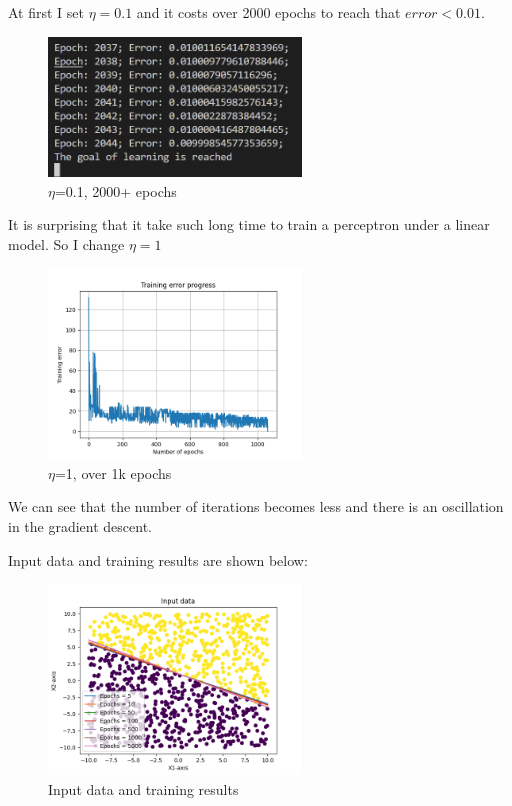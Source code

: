 At first I set $\eta=0.1$ and it costs over 2000 epochs to reach that $error < 0.01$.

\begin{figure}[H]
    \centering
    \includegraphics[width=0.6\textwidth]{./2023April/eta0.1.png}
    \caption{$\eta$=0.1, 2000+ epochs}
    \label{eta0.1}
\end{figure}

It is surprising that it take such long time to train a perceptron under a linear model. So I change $\eta=1$

\begin{figure}[H]
    \centering
    \includegraphics[width=0.6\textwidth]{./2023April/graphEta1.png}
    \caption{$\eta$=1, over 1k epochs}
    \label{eta1}
\end{figure}

We can see that the number of iterations becomes less and there is an oscillation in the gradient descent.

Input data and training results are shown below:

\begin{figure}[H]
    \centering
    \includegraphics[width=0.6\textwidth]{./2023April/input data.png}
    \caption{Input data and training results}
    \label{input data}
\end{figure}

